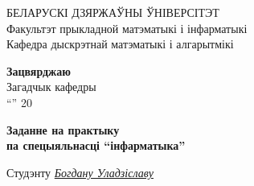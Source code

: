 \documentclass[12pt,a4paper]{extarticle}
\begin{document}
	\begin{center}
			БЕЛАРУСКІ ДЗЯРЖАЎНЫ ЎНІВЕРСІТЭТ \\
			Факультэт прыкладной матэматыкі і інфарматыкі \\
			Кафедра дыскрэтнай матэматыкі і алгарытмікі \\
	\end{center}
	\vspace{30pt}
	\begin{flushright}
		\textbf{Зацвярджаю} \\
		Загадчык кафедры \underline{\hspace{150pt}} \\
		``\underline{\hspace{25pt}}'' \underline{\hspace{70pt}} 20 \underline{\hspace{25pt}} \\
	\end{flushright}
	\vspace{30pt}
	\begin{center}
		\textbf{
			Заданне на практыку \\
			па спецыяльнасці ``інфарматыка'' \\
		}
	\end{center}
	\vspace{10pt}
	Студэнту \underline{\hspace{120pt}\textit{Богдану Уладзіславу}\hspace{120pt}} \\
	\renewcommand{\labelenumii}{\arabic{enumi}.\arabic{enumii}.}
\end{document}
